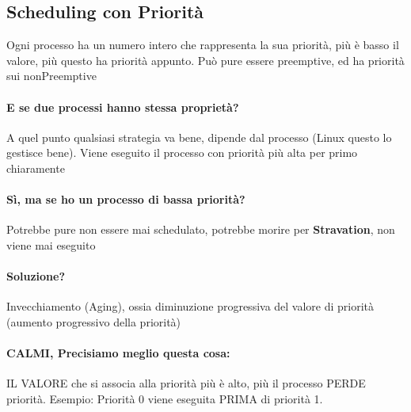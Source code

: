 \documentclass[12pt, a4paper, openany, twoside]{book}
\begin{document}
\subsection{Scheduling con Priorità}
Ogni processo ha un numero intero che rappresenta la sua priorità, più è basso
il valore, più questo ha priorità appunto.
Può pure essere preemptive, ed ha priorità sui nonPreemptive
\paragraph{E se due processi hanno stessa proprietà? }A quel punto qualsiasi
strategia va bene, dipende dal processo (Linux questo lo gestisce bene). 
Viene eseguito il processo con priorità più alta per primo chiaramente
\paragraph{Sì, ma se ho un processo di bassa priorità? }Potrebbe pure non essere 
mai schedulato, potrebbe morire per \textbf{Stravation}, non viene mai eseguito
\paragraph{Soluzione? }Invecchiamento (Aging), ossia diminuzione progressiva
del valore di priorità (aumento progressivo della priorità)  
\paragraph{CALMI, Precisiamo meglio questa cosa: }IL VALORE che si associa alla
priorità più è alto, più il processo PERDE priorità. Esempio: Priorità 0 viene 
eseguita PRIMA di priorità 1.
\end{document}
